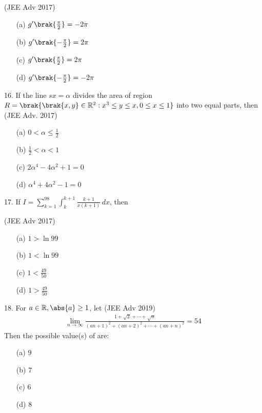 \hfill (JEE Adv 2017)
\begin{enumerate}
\item [(a)] $g'\brak{\frac{\pi}{2}} = -2\pi$
\item [(b)] $g' \brak{-\frac{\pi}{2}} = 2\pi$
\item[(c)] $g' \brak{\frac{\pi}{2}} = 2\pi$
\item[(d)] $g' \brak{-\frac{\pi}{2}} = -2\pi$
\end{enumerate}
\item 16. If the line $sx = \alpha$ divides the area of region
$R = \brak{\brak{x, y} \in \mathbb{R}^2 : x^3 \leq y \leq x, 0 \leq x \leq 1}$
into two equal parts, then \hfill (JEE Adv. 2017)
\begin{enumerate}
\item[(a)] $0 < \alpha \leq \frac{1}{2}$
\item[(b)] $\frac{1}{2} < \alpha < 1$
\item[(c)] $2\alpha^4 - 4\alpha^2 + 1 = 0$
\item[(d)] $\alpha^4 + 4\alpha^2 - 1 = 0$
\end{enumerate}
\item 17. If $I = \sum_{k=1}^{98} \int_{k}^{k+1} \frac{k+1}{x(k+1)} \, dx$, then

\hfill (JEE Adv 2017)
\begin{enumerate}
\item[(a)] $1 > \ln 99$
\item[(b)] $1 < \ln 99$
\item[(c)] $1 < \frac{49}{50}$  
\item [(d)] $1 > \frac{49}{50}$
\end{enumerate}
\item 18. For $a \in \mathbb{R}, \abs{a} \geq 1$, let \hfill (JEE Adv 2019)
\begin{align*}
\lim_{{n \to \infty}} \frac{1 + \sqrt{2} + \cdots + \sqrt{n}}{(an+1)^2 + (an+2)^2 + \cdots + (an+n)^2} = 54
\end{align*}
Then the possible value(s) of  are:
\begin{enumerate}
\item[(a)] $9$
\item[(b)] $7$
\item[(c)] $6$
\item[(d)] $8$
\end{enumerate}

